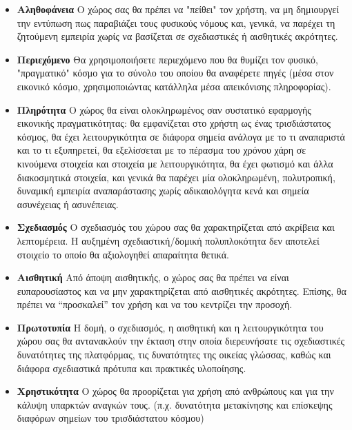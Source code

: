 \documentclass[12pt]{article}
\begin{document}
	\begin{itemize}
		\item \textbf{Αληθοφάνεια} Ο χώρος σας θα πρέπει να "πείθει" τον χρήστη, να μη δημιουργεί την εντύπωση πως παραβιάζει τους φυσικούς νόμους και, γενικά, να παρέχει τη ζητούμενη εμπειρία χωρίς να βασίζεται σε σχεδιαστικές ή αισθητικές ακρότητες.
		
		\item \textbf{Περιεχόμενο} Θα χρησιμοποιήσετε περιεχόμενο που θα θυμίζει τον φυσικό, "πραγματικό" κόσμο για το σύνολο του οποίου θα αναφέρετε πηγές (μέσα στον εικονικό κόσμο, χρησιμοποιώντας κατάλληλα μέσα απεικόνισης πληροφορίας).

		\item \textbf{Πληρότητα}  Ο χώρος θα είναι ολοκληρωμένος σαν συστατικό εφαρμογής εικονικής πραγματικότητας: θα εμφανίζεται στο χρήστη ως ένας τρισδιάστατος κόσμος, θα έχει λειτουργικότητα σε διάφορα σημεία ανάλογα με το τι αναπαριστά και το τι εξυπηρετεί, θα εξελίσσεται με το πέρασμα του χρόνου χάρη σε κινούμενα στοιχεία και στοιχεία με λειτουργικότητα, θα έχει φωτισμό και άλλα διακοσμητικά στοιχεία, και γενικά θα παρέχει μία ολοκληρωμένη, πολυτροπική, δυναμική εμπειρία αναπαράστασης χωρίς αδικαιολόγητα κενά και σημεία ασυνέχειας ή ασυνέπειας.
		
		\item \textbf{Σχεδιασμός} Ο σχεδιασμός του χώρου σας θα χαρακτηρίζεται από ακρίβεια και λεπτομέρεια. Η αυξημένη σχεδιαστική/δομική πολυπλοκότητα δεν αποτελεί στοιχείο το οποίο θα αξιολογηθεί απαραίτητα θετικά.
		
		\item \textbf{Αισθητική} Από άποψη αισθητικής, ο χώρος σας θα πρέπει να είναι ευπαρουσίαστος και να μην χαρακτηρίζεται από αισθητικές ακρότητες. Επίσης, θα πρέπει να “προσκαλεί” τον χρήση και να του κεντρίζει την προσοχή.
		
		\item \textbf{Πρωτοτυπία} Η δομή, ο σχεδιασμός, η αισθητική και η λειτουργικότητα του χώρου σας θα αντανακλούν την έκταση στην οποία διερευνήσατε τις σχεδιαστικές δυνατότητες της πλατφόρμας, τις δυνατότητες της οικείας γλώσσας, καθώς και διάφορα σχεδιαστικά πρότυπα και πρακτικές υλοποίησης.
		
		\item \textbf{Χρηστικότητα} Ο χώρος θα προορίζεται για χρήση από ανθρώπους και για την κάλυψη υπαρκτών αναγκών τους. (π.χ. δυνατότητα μετακίνησης και επίσκεψης διαφόρων σημείων του τρισδιάστατου κόσμου)
		

\end{itemize}
\end{document}
